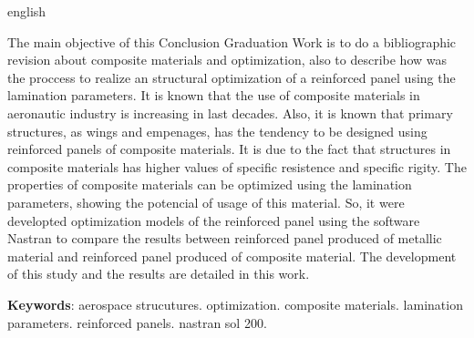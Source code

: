 \begin{resumo}[Abstract]
\begin{otherlanguage*}{english}

The main objective of this Conclusion Graduation Work is to do a bibliographic revision about composite materials and optimization, also to describe how was the proccess to realize an structural optimization of a reinforced panel using the lamination parameters. It is known that the use of composite materials in aeronautic industry is increasing in last decades. Also, it is known that primary structures, as wings and empenages, has the tendency to be designed using reinforced panels of composite materials. It is due to the fact that structures in composite materials has higher values of specific resistence and specific rigity. The properties of composite materials can be optimized using the lamination parameters, showing the potencial of usage of this material. So, it were developted optimization models of the reinforced panel using the software Nastran to compare the results between reinforced panel produced of metallic material and reinforced panel produced of composite material. The development of this study and the results are detailed in this work.

\textbf{Keywords}: aerospace strucutures. optimization. composite materials. lamination parameters. reinforced panels. nastran sol 200.
\end{otherlanguage*}
\end{resumo}
%
%
%
%

